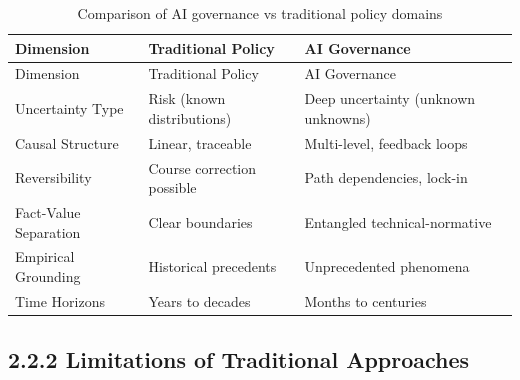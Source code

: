 \documentclass[
  11pt,
  letterpaper,
  openany]{book}
\begin{document}
\begin{longtable}[]{@{}
  >{\raggedright\arraybackslash}p{}
  >{\raggedright\arraybackslash}p{}
  >{\raggedright\arraybackslash}p{}@{}}
\caption{Comparison of AI governance vs traditional policy
domains}\label{tbl-governance-challenges}\tabularnewline
\toprule\noalign{}
\begin{minipage}[b]{\linewidth}\raggedright
Dimension
\end{minipage} & \begin{minipage}[b]{\linewidth}\raggedright
Traditional Policy
\end{minipage} & \begin{minipage}[b]{\linewidth}\raggedright
AI Governance
\end{minipage} \\
\midrule\noalign{}
\endfirsthead
\toprule\noalign{}
\begin{minipage}[b]{\linewidth}\raggedright
Dimension
\end{minipage} & \begin{minipage}[b]{\linewidth}\raggedright
Traditional Policy
\end{minipage} & \begin{minipage}[b]{\linewidth}\raggedright
AI Governance
\end{minipage} \\
\midrule\noalign{}
\endhead
\bottomrule\noalign{}
\endlastfoot
Uncertainty Type & Risk (known distributions) & Deep uncertainty
(unknown unknowns) \\
Causal Structure & Linear, traceable & Multi-level, feedback loops \\
Reversibility & Course correction possible & Path dependencies,
lock-in \\
Fact-Value Separation & Clear boundaries & Entangled
technical-normative \\
Empirical Grounding & Historical precedents & Unprecedented phenomena \\
Time Horizons & Years to decades & Months to centuries \\
\end{longtable}

\subsection{2.2.2 Limitations of Traditional
Approaches}\label{limitations-of-traditional-approaches}
\end{document}
